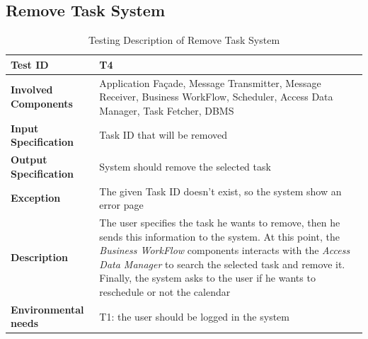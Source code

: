 \subsection*{Remove Task System}

\begin{table}[H]
    \centering
    \begin{tabular}{p{4.55cm} p{7cm}}
        
        \hline
        
        \textbf{Test ID}                & T4 \\
        
        \hline
        
        \textbf{Involved Components}    & Application Façade, Message Transmitter, Message Receiver, Business                                          WorkFlow, Scheduler, Access Data Manager, Task Fetcher, DBMS\\
        
        \hline
        
        \textbf{Input Specification}    & Task ID that will be removed\\
        
        \hline
        
        \textbf{Output Specification}   & System should remove the selected task\\
        
        \hline
        
        \textbf{Exception}              & The given Task ID doesn't exist, so the system show an error page\\
        
        \hline
        
        \textbf{Description}            & The user specifies the task he wants to remove, then he sends this information to the system. At this point, the \emph{Business WorkFlow} components interacts with the \emph{Access Data Manager} to search the selected task and remove it. Finally, the system asks to the user if he wants to reschedule or not the calendar\\
        \hline
        
        \textbf{Environmental needs}    & T1: the user should be logged in the system\\
        
        \hline
        
    \end{tabular}
    \caption{Testing Description of Remove Task System}
\end{table}




